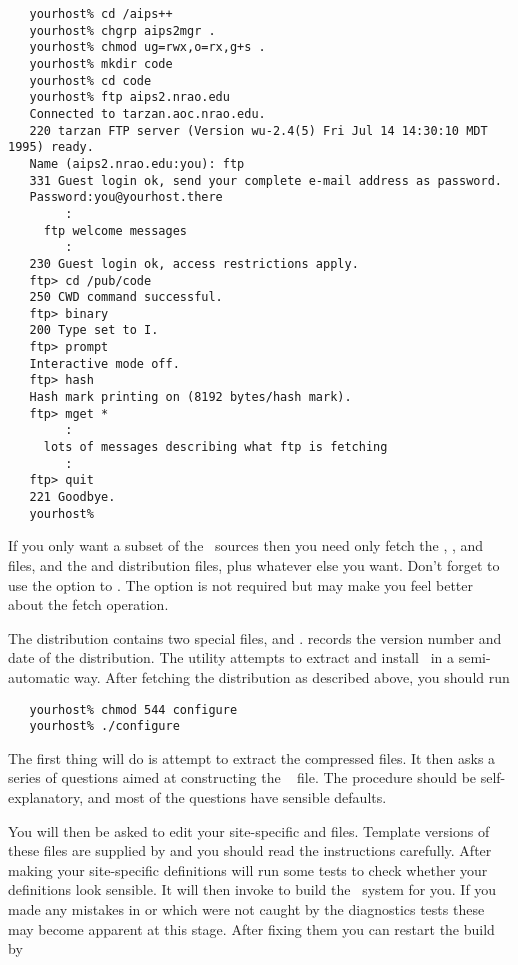 \begin{verbatim}
   yourhost% cd /aips++
   yourhost% chgrp aips2mgr .
   yourhost% chmod ug=rwx,o=rx,g+s .
   yourhost% mkdir code
   yourhost% cd code
   yourhost% ftp aips2.nrao.edu
   Connected to tarzan.aoc.nrao.edu.
   220 tarzan FTP server (Version wu-2.4(5) Fri Jul 14 14:30:10 MDT 1995) ready.
   Name (aips2.nrao.edu:you): ftp
   331 Guest login ok, send your complete e-mail address as password.
   Password:you@yourhost.there
        :
     ftp welcome messages
        :
   230 Guest login ok, access restrictions apply.
   ftp> cd /pub/code
   250 CWD command successful.
   ftp> binary
   200 Type set to I.
   ftp> prompt
   Interactive mode off.
   ftp> hash
   Hash mark printing on (8192 bytes/hash mark).
   ftp> mget *
        :
     lots of messages describing what ftp is fetching
        :
   ftp> quit
   221 Goodbye.
   yourhost%
\end{verbatim}

\noindent
If you only want a subset of the \aipspp\ sources then you need only fetch the
, , and  files, and the
 and  distribution  files, plus whatever
else you want.  Don't forget to use the  option to .
The  option is not required but may make you feel better about the
fetch operation.

The distribution contains two special files,  and
.   records the version number and date of the
distribution.  The  utility attempts to extract and install
\aipspp\ in a semi-automatic way.  After fetching the distribution as
described above, you should run 

\begin{verbatim}
   yourhost% chmod 544 configure
   yourhost% ./configure
\end{verbatim}

\noindent
The first thing  will do is attempt to extract the
compressed  files.  It then asks a series of questions aimed at
constructing the \aipspp\  file.  The procedure should be
self-explanatory, and most of the questions have sensible defaults.

You will then be asked to edit your site-specific  and
 files.  Template versions of these files are supplied by
 and you should read the instructions carefully.  After
making your site-specific definitions  will run some tests
to check whether your  definitions look sensible.  It will then
invoke  to build the \aipspp\ system for you.  If you made any
mistakes in  or  which were not caught by the
diagnostics tests these may become apparent at this stage.  After fixing them
you can restart the build by

